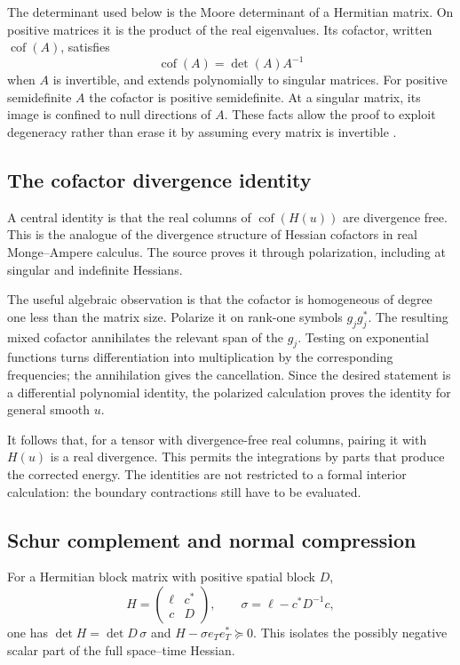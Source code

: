 \documentclass[11pt,a4paper]{article}
\numberwithin{equation}{section}
\theoremstyle{definition}
\theoremstyle{remark}
\begin{document}
The determinant used below is the Moore determinant of a Hermitian matrix.
On positive matrices it is the product of the real eigenvalues. Its cofactor,
written $\operatorname{cof}(A)$, satisfies
\[
 \operatorname{cof}(A)=\det(A)A^{-1}
\]
when $A$ is invertible, and extends polynomially to singular matrices. For
positive semidefinite $A$ the cofactor is positive semidefinite. At a singular
matrix, its image is confined to null directions of $A$.
These facts allow the proof to exploit degeneracy rather than erase it by
assuming every matrix is invertible \cite{calculus}.

\subsection{The cofactor divergence identity}
A central identity is that the real columns of $\operatorname{cof}(H(u))$ are
divergence free. This is the analogue of the divergence structure of Hessian
cofactors in real Monge--Ampere calculus. The source proves it through
polarization, including at singular and indefinite Hessians.

The useful algebraic observation is that the cofactor is homogeneous of degree
one less than the matrix size. Polarize it on rank-one symbols $g_jg_j^*$.
The resulting mixed cofactor annihilates the relevant span of the $g_j$.
Testing on exponential functions turns differentiation into multiplication by
the corresponding frequencies; the annihilation gives the cancellation.
Since the desired statement is a differential polynomial identity, the
polarized calculation proves the identity for general smooth $u$.

It follows that, for a tensor with divergence-free real columns, pairing it
with $H(u)$ is a real divergence. This permits the integrations by parts that
produce the corrected energy. The identities are not restricted to a formal
interior calculation: the boundary contractions still have to be evaluated.

\subsection{Schur complement and normal compression}
For a Hermitian block matrix with positive spatial block $D$,
\[
 H=\begin{pmatrix}\ell&c^*\\c&D\end{pmatrix},\qquad
 \sigma=\ell-c^*D^{-1}c,
\]
one has $\det H=\det D\,\sigma$ and
$H-\sigma e_Te_T^*\succeq0$. This isolates the possibly negative scalar
part of the full space--time Hessian.
\end{document}
